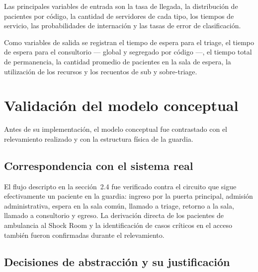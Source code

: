 \documentclass{article}
\begin{document}
Las principales variables de entrada son la tasa de llegada, la distribución
de pacientes por código, la cantidad de servidores de cada tipo, los tiempos
de servicio, las probabilidades de internación y las tasas de error de
clasificación.

Como variables de salida se registran el tiempo de espera para el triage, el
tiempo de espera para el consultorio --- global y segregado por código ---,
el tiempo total de permanencia, la cantidad promedio de pacientes en la sala
de espera, la utilización de los recursos y los recuentos de sub y
sobre-triage.

\section{Validación del modelo conceptual}

Antes de su implementación, el modelo conceptual fue contrastado con el
relevamiento realizado y con la estructura física de la guardia.

\subsection{Correspondencia con el sistema real}

El flujo descripto en la sección~2.4 fue verificado contra el circuito que
sigue efectivamente un paciente en la guardia: ingreso por la puerta
principal, admisión administrativa, espera en la sala común, llamado a
triage, retorno a la sala, llamado a consultorio y egreso. La derivación
directa de los pacientes de ambulancia al Shock Room y la identificación de
casos críticos en el acceso también fueron confirmadas durante el
relevamiento.

\subsection{Decisiones de abstracción y su justificación}
\end{document}
